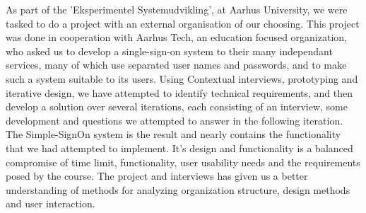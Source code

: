 As part of the 'Eksperimentel Systemudvikling', at Aarhus University,
we were tasked to do a project with an external organisation of our choosing.
This project was done in cooperation with Aarhus Tech, an education focused organization, 
who asked us to develop a single-sign-on system to their many independant services, 
many of which use separated user names and passwords, and to make such a system suitable to its users.
Using Contextual interviews, prototyping and iterative design, 
we have attempted to identify technical requirements, 
and then develop a solution over several iterations, each consisting of an interview, 
some development and questions we attempted to answer in the following iteration.
The Simple-SignOn system is the result 
and nearly contains the functionality that we had attempted to implement.
It's design and functionality is a balanced compromise of time limit, functionality, 
user usability needs and the requirements posed by the course.
The project and interviews has given us a better understanding of 
methods for analyzing organization structure, design methods and user interaction.
